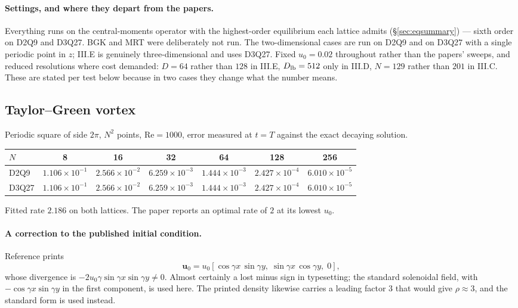 \documentclass[11pt,a4paper]{article}
\newcommand{\uu}{\bm{u}}
\newcommand{\e}[1]{\times 10^{#1}}
\begin{document}
\paragraph{Settings, and where they depart from the papers.} Everything runs on
the central-moments operator with the highest-order equilibrium each lattice
admits (\S\ref{sec:eqsummary}) --- sixth order on D2Q9 and D3Q27. BGK and MRT
were deliberately not run. The two-dimensional cases are run on D2Q9 and on
D3Q27 with a single periodic point in $z$; III.E is genuinely
three-dimensional and uses D3Q27. Fixed $u_0=0.02$
throughout rather than the papers' sweeps, and reduced resolutions where cost
demanded: $D=64$ rather than $128$ in III.E, $D_{\rm lb}=512$ only in III.D,
$N=129$ rather than $201$ in III.C. These are stated per test below because in
two cases they change what the number means.

\subsection{Taylor--Green vortex}

Periodic square of side $2\pi$, $N^2$ points, $\mathrm{Re}=1000$, error measured
at $t=T$ against the exact decaying solution.

\begin{center}\small
\begin{tabular}{lcccccc}
\toprule
$N$ & 8 & 16 & 32 & 64 & 128 & 256 \\
\midrule
D2Q9  & $1.106\e{-1}$ & $2.566\e{-2}$ & $6.259\e{-3}$ & $1.444\e{-3}$ & $2.427\e{-4}$ & $6.010\e{-5}$ \\
D3Q27 & $1.106\e{-1}$ & $2.566\e{-2}$ & $6.259\e{-3}$ & $1.444\e{-3}$ & $2.427\e{-4}$ & $6.010\e{-5}$ \\
\bottomrule
\end{tabular}
\end{center}
\noindent Fitted rate $2.186$ on both lattices. The paper
reports an optimal rate of $2$ at its lowest $u_0$.

\paragraph{A correction to the published initial condition.} Reference
\cite{derosis2020} prints
\begin{equation*}
  \uu_0 = u_0[\cos\gamma x\,\sin\gamma y,\;\sin\gamma x\,\cos\gamma y,\;0],
\end{equation*}
whose divergence is $-2u_0\gamma\sin\gamma x\sin\gamma y \neq 0$. Almost certainly a lost minus
sign in typesetting; the standard solenoidal field, with $-\cos\gamma x
\sin\gamma y$ in the first component, is used here. The printed density
likewise carries a leading factor $3$ that would give $\rho\approx 3$, and the
standard form is used instead.
\end{document}
